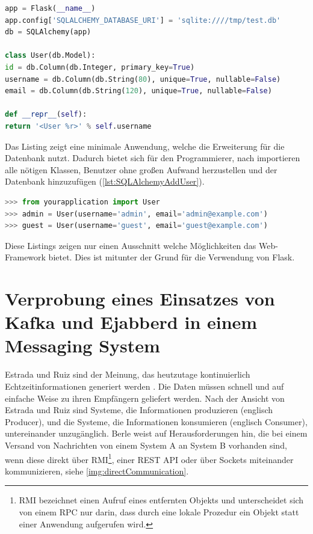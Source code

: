 \documentclass[a4paper,titlepage,halfparskip,12pt]{scrreprt}
\begin{document}
\begin{onehalfspacing}
\begin{lstlisting}[language=Python,caption=Example Listing of Flask-SQLAlchemy,label={lst:SQLAlchemyMinApp}]
app = Flask(__name__)
app.config['SQLALCHEMY_DATABASE_URI'] = 'sqlite:////tmp/test.db'
db = SQLAlchemy(app)

class User(db.Model):
id = db.Column(db.Integer, primary_key=True)
username = db.Column(db.String(80), unique=True, nullable=False)
email = db.Column(db.String(120), unique=True, nullable=False)

def __repr__(self):
return '<User %r>' % self.username
\end{lstlisting}
Das Listing zeigt eine minimale Anwendung, welche die Erweiterung für die Datenbank nutzt. Dadurch bietet sich für den Programmierer, nach importieren alle nötigen Klassen, Benutzer ohne großen Aufwand herzustellen und der Datenbank hinzuzufügen (\autoref{lst:SQLAlchemyAddUser}).
\begin{lstlisting}[language=Python,caption=Hinzufügen eines Objektes in die Datenbanktabelle,label={lst:SQLAlchemyAddUser}]
>>> from yourapplication import User
>>> admin = User(username='admin', email='admin@example.com')
>>> guest = User(username='guest', email='guest@example.com')
\end{lstlisting}
Diese Listings zeigen nur einen Ausschnitt welche Möglichkeiten das Web-Framework bietet. Dies ist mitunter der Grund für die Verwendung von Flask.\cite{FlaskDoc}
\pagebreak

\section{Verprobung eines Einsatzes von Kafka und Ejabberd in einem Messaging System}
\label{sec:VerprbungIMS}

Estrada und Ruiz sind der Meinung, das heutzutage kontinuierlich Echtzeitinformationen generiert werden \cite{estradaRuiz2016}. Die Daten müssen schnell und auf einfache Weise zu ihren Empfängern geliefert werden. Nach der Ansicht von Estrada und Ruiz \cite{estradaRuiz2016} sind Systeme, die Informationen produzieren (englisch Producer), und die Systeme, die Informationen konsumieren (englisch Consumer), untereinander unzugänglich. Berle \cite{berleKafkaOverview} weist auf Herausforderungen hin, die bei einem Versand von Nachrichten von einem System A an System B vorhanden sind, wenn diese direkt über \acs{RMI}\footnote{\ac{RMI} bezeichnet einen Aufruf eines entfernten Objekts und unterscheidet sich von einem \ac{RPC} nur darin, dass durch eine lokale Prozedur ein Objekt statt einer Anwendung aufgerufen wird.\cite[S.41]{andrew2008verteilte}}, einer \acs{REST} \acs{API} oder über Sockets miteinander kommunizieren, siehe \autoref{img:directCommunication}.


\end{onehalfspacing}
\end{document}
